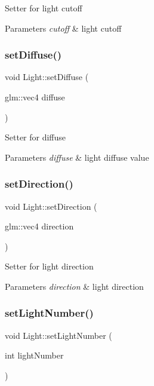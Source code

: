 Setter for light cutoff 
\begin{DoxyParams}{Parameters}
{\em cutoff} & light cutoff \\
\hline
\end{DoxyParams}
\mbox{\label{classLight_adc52e832ae3c0319a836488b0ef548a4}} 
\subsubsection{\texorpdfstring{set\+Diffuse()}{setDiffuse()}}
{\footnotesize\ttfamily void Light\+::set\+Diffuse (\begin{DoxyParamCaption}\item[{glm\+::vec4}]{diffuse }\end{DoxyParamCaption})}

Setter for diffuse 
\begin{DoxyParams}{Parameters}
{\em diffuse} & light diffuse value \\
\hline
\end{DoxyParams}
\mbox{\label{classLight_aa32662da42afe808259609126aabe7f1}} 
\subsubsection{\texorpdfstring{set\+Direction()}{setDirection()}}
{\footnotesize\ttfamily void Light\+::set\+Direction (\begin{DoxyParamCaption}\item[{glm\+::vec4}]{direction }\end{DoxyParamCaption})}

Setter for light direction 
\begin{DoxyParams}{Parameters}
{\em direction} & light direction \\
\hline
\end{DoxyParams}
\mbox{\label{classLight_aa2da7de405831666a6af15c6244beed8}} 
\subsubsection{\texorpdfstring{set\+Light\+Number()}{setLightNumber()}}
{\footnotesize\ttfamily void Light\+::set\+Light\+Number (\begin{DoxyParamCaption}\item[{int}]{light\+Number }\end{DoxyParamCaption})}

